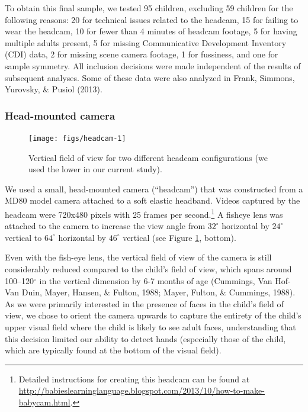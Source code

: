 \documentclass[10pt, letterpaper]{article}
\newenvironment{CodeChunk}{}{}
\begin{document}
To obtain this final sample, we tested 95 children, excluding 59
children for the following reasons: 20 for technical issues related to
the headcam, 15 for failing to wear the headcam, 10 for fewer than 4
minutes of headcam footage, 5 for having multiple adults present, 5 for
missing Communicative Development Inventory (CDI) data, 2 for missing
scene camera footage, 1 for fussiness, and one for sample symmetry. All
inclusion decisions were made independent of the results of subsequent
analyses. Some of these data were also analyzed in Frank, Simmons,
Yurovsky, \& Pusiol (2013).

\subsubsection{Head-mounted camera}\label{head-mounted-camera}

\begin{CodeChunk}
\begin{figure}[H]

{\centering \texttt{[image: figs/headcam-1]} 

}

\caption[Vertical field of view for two different headcam configurations (we used the lower in our current study)]{Vertical field of view for two different headcam configurations (we used the lower in our current study).}\label{fig:headcam}
\end{figure}
\end{CodeChunk}

We used a small, head-mounted camera (``headcam'') that was constructed
from a MD80 model camera attached to a soft elastic headband. Videos
captured by the headcam were 720x480 pixels with 25 frames per
second.\footnote{Detailed instructions for creating this headcam can be
  found at
  \url{http://babieslearninglanguage.blogspot.com/2013/10/how-to-make-babycam.html}.}
A fisheye lens was attached to the camera to increase the view angle
from \(32^{\circ}\) horizontal by \(24^{\circ}\) vertical to
\(64^{\circ}\) horizontal by \(46^{\circ}\) vertical (see Figure
\ref{fig:headcam}, bottom).

Even with the fish-eye lens, the vertical field of view of the camera is
still considerably reduced compared to the child's field of view, which
spans around 100--120\(^{\circ}\) in the vertical dimension by 6-7
months of age (Cummings, Van Hof-Van Duin, Mayer, Hansen, \& Fulton,
1988; Mayer, Fulton, \& Cummings, 1988). As we were primarily interested
in the presence of faces in the child's field of view, we chose to
orient the camera upwards to capture the entirety of the child's upper
visual field where the child is likely to see adult faces, understanding
that this decision limited our ability to detect hands (especially those
of the child, which are typically found at the bottom of the visual
field).
\end{document}
